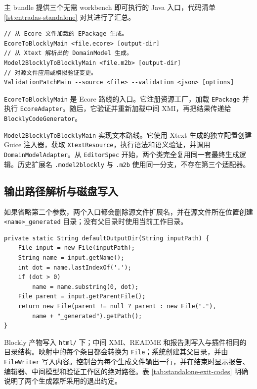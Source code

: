 主 bundle 提供三个无需 workbench 即可执行的 Java 入口，代码清单 \ref{lst:entradas-standalone} 对其进行了汇总。

\begin{lstlisting}[style=tfmcli, caption={独立入口的命令行接口}, label={lst:entradas-standalone}]
// 从 Ecore 文件加载的 EPackage 生成。
EcoreToBlocklyMain <file.ecore> [output-dir]
// 从 Xtext 解析出的 DomainModel 生成。
Model2BlocklyToBlocklyMain <file.m2b> [output-dir]
// 对源文件应用或模拟验证变更。
ValidationPatchMain --source <file> --validation <json> [options]
\end{lstlisting}

\texttt{EcoreToBlocklyMain} 是 Ecore 路线的入口。它注册资源工厂，加载 \texttt{EPackage} 并执行 \texttt{EcoreAdapter}。随后，它验证并重新加载中间 XMI，再把结果传递给 \texttt{BlocklyCodeGenerator}。

\texttt{Model2BlocklyToBlocklyMain} 实现文本路线。它使用 Xtext 生成的独立配置创建 Guice 注入器，获取 \texttt{XtextResource}，执行语法和语义验证，并调用 \texttt{DomainModelAdapter}。从 \texttt{EditorSpec} 开始，两个类完全复用同一套最终生成逻辑。历史扩展名 \texttt{.model2blockly} 与 \texttt{.m2b} 使用同一分支，不存在第三个适配器。

\subsection{输出路径解析与磁盘写入}

如果省略第二个参数，两个入口都会删除源文件扩展名，并在源文件所在位置创建
\texttt{<name>}\allowbreak\texttt{\_generated} 目录；没有父目录时使用当前工作目录。

\begin{lstlisting}[style=tfmjava, caption={独立入口的默认输出目录计算}, label={lst:standalone-default-output}]
private static String defaultOutputDir(String inputPath) {
    File input = new File(inputPath);
    String name = input.getName();
    int dot = name.lastIndexOf('.');
    if (dot > 0)
        name = name.substring(0, dot);
    File parent = input.getParentFile();
    return new File(parent != null ? parent : new File("."),
        name + "_generated").getPath();
}
\end{lstlisting}

Blockly 产物写入 \texttt{html/} 下；中间 XMI、README 和报告则写入与插件相同的目录结构。映射中的每个条目都会转换为 \texttt{File}；系统创建其父目录，并由 \texttt{FileWriter} 写入内容。控制台为每个生成文件输出一行，并在结束时显示报告、编辑器、中间模型和验证工作区的绝对路径。表 \ref{tab:standalone-exit-codes} 明确说明了两个生成器所采用的退出约定。

